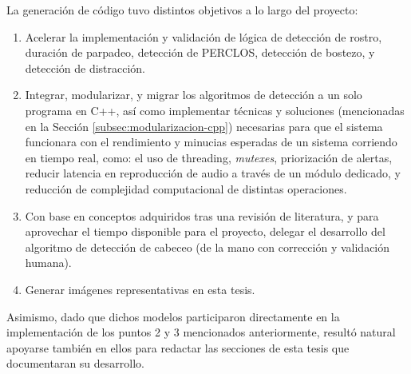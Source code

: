 La generación de código tuvo distintos objetivos a lo largo del proyecto: 

\begin{enumerate}
    \item Acelerar la implementación y validación de lógica de detección de rostro, duración de parpadeo, detección de PERCLOS, detección de bostezo, y detección de distracción.
    \item Integrar, modularizar, y migrar los algoritmos de detección a un solo programa en C++, así como implementar técnicas y soluciones (mencionadas en la Sección \ref{subsec:modularizacion-cpp}) necesarias para que el sistema funcionara con el rendimiento y minucias esperadas de un sistema corriendo en tiempo real, como: el uso de threading, \textit{mutexes}, priorización de alertas, reducir latencia en reproducción de audio a través de un módulo dedicado, y reducción de complejidad computacional de distintas operaciones. 
    \item Con base en conceptos adquiridos tras una revisión de literatura, y para aprovechar el tiempo disponible para el proyecto, delegar el desarrollo del algoritmo de detección de cabeceo (de la mano con corrección y validación humana). 
    \item Generar imágenes representativas en esta tesis.
\end{enumerate}

Asimismo, dado que dichos modelos participaron directamente en la implementación de los puntos 2 y 3 mencionados anteriormente, resultó natural apoyarse también en ellos para redactar las secciones de esta tesis que documentaran su desarrollo.